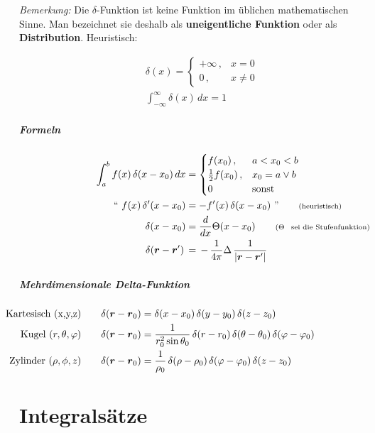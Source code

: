 \documentclass[titlepage,11pt,a4paper,ngerman]{report}
\renewcommand{\vec}[1]{\boldsymbol{#1}}
\begin{document}
\emph{Bemerkung:} Die $\delta$-Funktion ist keine Funktion im üblichen mathematischen Sinne. Man bezeichnet sie deshalb als \textbf{uneigentliche Funktion} oder als \textbf{Distribution}. Heuristisch:

\begin{align*}
&\delta(x) = 
	\begin{cases}
		+ \infty \, , & x = 0 \\
		0 \, , & x \neq 0
	\end{cases} \\
&\int_{-\infty}^{\infty} \delta (x) \, dx = 1
\end{align*}

\subparagraph{Formeln}
\begin{align*}
\int_{a}^{b} f(x) \, \delta (x-x_0) \, dx &= 
	\begin{cases}
		f(x_0) \, , & a < x_0 < b \\
		\frac{1}{2} f(x_0) \, , & x_0 = a \lor b \\
		0 \, & \text{sonst}
	\end{cases} \\
`` \ f(x) \, \delta '(x-x_0) &= -f'(x) \, \delta (x-x_0) \ " \qquad \rlap{\text{\scriptsize{(heuristisch)}}} \\
\delta (x - x_0) &= \frac{d}{dx} \Theta (x - x_0) \qquad \rlap{\scriptsize{($ \Theta $ \, \text{sei die Stufenfunktion)}}}\\
\delta(\vec{r}-\vec{r}')\,&=\,-\,\frac{1}{4\pi}\Delta\,\frac{1}{|\vec{r}-\vec{r}'|}
\end{align*} 

\subparagraph{Mehrdimensionale Delta-Funktion}
\begin{align*}
\llap{\text{Kartesisch (x,y,z)}} \qquad \delta(\vec{r} - \vec{r}_0) &= \delta(x - x_0) \, \delta(y - y_0) \, \delta(z - z_0) \\
\llap{\text{Kugel $ (r, \theta, \varphi) $}} \qquad \delta(\vec{r} - \vec{r}_0) &= \frac{1}{r^2_0 \sin\theta_0} \, \delta(r - r_0) \, \delta(\theta - \theta _0) \, \delta(\varphi - \varphi _0) \\
\llap{\text{Zylinder $ (\rho , \phi , z) $}} \qquad \delta(\vec{r} - \vec{r}_0) &= \frac{1}{\rho _0} \, \delta(\rho - \rho _0) \, \delta(\varphi - \varphi _0) \, \delta(z - z _0)
\end{align*}

\section{Integralsätze}
\end{document}
